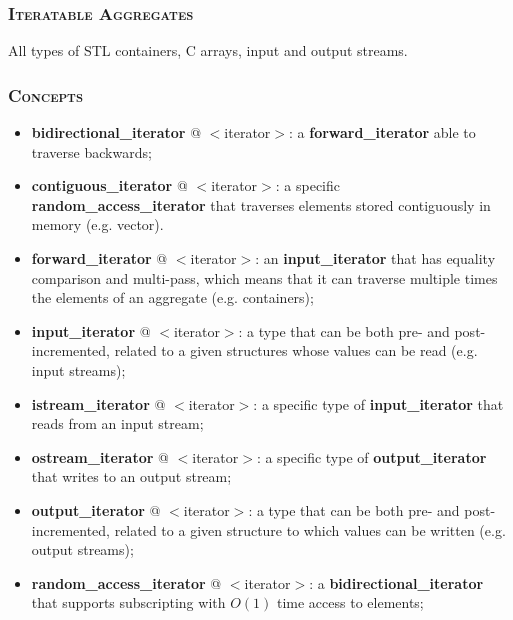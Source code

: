 \documentclass[10pt]{article}
\begin{document}
\begin{multicols*}{5}
{\subsubsection*{\textsc{Iteratable Aggregates}} 
\noindent
All types of STL containers, C arrays, input and output streams.

\subsubsection*{\textsc{Concepts}} 
\begin{itemize}[leftmargin=*,topsep=0.25pt]
  \setlength\itemsep{-1.8pt}
	\item \textbf{bidirectional\_iterator} @ $<$iterator$>$: a \textbf{for\-ward\_ite\-ra\-tor} able to traverse backwards; 
	\item \textbf{contiguous\_iterator} @ $<$iterator$>$: a specific \textbf{ran\-dom\_ac\-cess\_i\-te\-ra\-tor} that traverses elements stored contiguously in memory (e.g. vector). 
	\item \textbf{forward\_iterator} @ $<$iterator$>$: an \textbf{input\_iterator} that has equality comparison and multi-pass, which means that it can traverse multiple times the elements of an aggregate (e.g. containers); 
	\item \textbf{input\_iterator} @ $<$iterator$>$: a type that can be both pre- and post-incremented, related to a given structures whose values can be read (e.g. input streams);
	\item \textbf{istream\_iterator} @ $<$iterator$>$: a specific type of \textbf{in\-put\_i\-te\-ra\-tor} that reads from an input stream;
	\item \textbf{ostream\_iterator} @ $<$iterator$>$: a specific type of \textbf{out\-put\_i\-te\-ra\-tor} that writes to an output stream;
	\item \textbf{output\_iterator} @ $<$iterator$>$: a type that can be both pre- and post-incremented, related to a given structure to which values can be written (e.g. output streams);
	\item \textbf{random\_access\_iterator} @ $<$iterator$>$: a \textbf{bidirectional\_iterator} that supports subscripting with $O(1)$ time access to elements; 
\end{itemize}

}
\end{multicols*}
\end{document}
